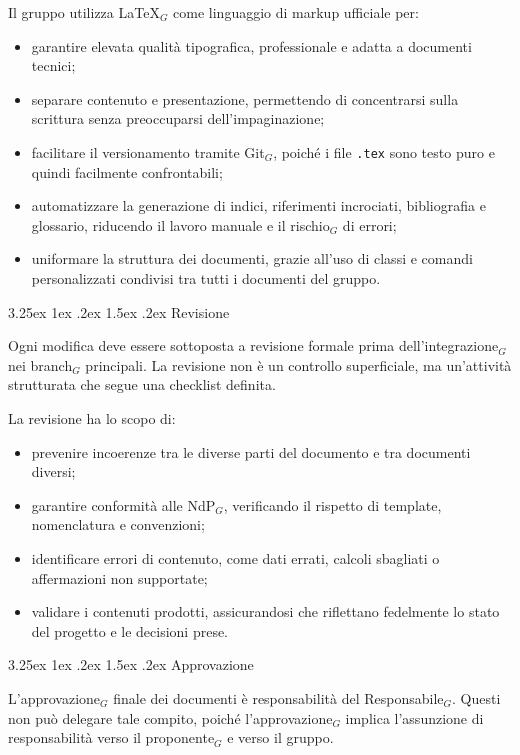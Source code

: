 \documentclass[a4paper, 10pt]{article}
\makeatletter
\renewcommand\paragraph{\@startsection{paragraph}{4}{\z@}%
  {3.25ex \@plus1ex \@minus .2ex}%
  {1.5ex \@plus .2ex}%
  {\normalfont\normalsize\bfseries}}
\makeatother
\begin{document}
Il gruppo utilizza \LaTeX$_G$ come linguaggio di markup ufficiale per:
\begin{itemize}
    \item garantire elevata qualità tipografica, professionale e adatta a documenti tecnici;
    \item separare contenuto e presentazione, permettendo di concentrarsi sulla scrittura senza preoccuparsi dell'impaginazione;
    \item facilitare il versionamento tramite Git$_G$, poiché i file \texttt{.tex} sono testo puro e quindi facilmente confrontabili;
    \item automatizzare la generazione di indici, riferimenti incrociati, bibliografia e glossario, riducendo il lavoro manuale e il rischio$_G$ di errori;
    \item uniformare la struttura dei documenti, grazie all'uso di classi e comandi personalizzati condivisi tra tutti i documenti del gruppo.
\end{itemize}

\paragraph{Revisione}

Ogni modifica deve essere sottoposta a revisione formale prima dell'integrazione$_G$ nei branch$_G$ principali. La revisione non è un controllo superficiale, ma un'attività strutturata che segue una checklist definita.

La revisione ha lo scopo di:
\begin{itemize}
    \item prevenire incoerenze tra le diverse parti del documento e tra documenti diversi;
    \item garantire conformità alle NdP$_G$, verificando il rispetto di template, nomenclatura e convenzioni;
    \item identificare errori di contenuto, come dati errati, calcoli sbagliati o affermazioni non supportate;
    \item validare i contenuti prodotti, assicurandosi che riflettano fedelmente lo stato del progetto e le decisioni prese.
\end{itemize}

\paragraph{Approvazione}

L'approvazione$_G$ finale dei documenti è responsabilità del Responsabile$_G$. Questi non può delegare tale compito, poiché l'approvazione$_G$ implica l'assunzione di responsabilità verso il proponente$_G$ e verso il gruppo.
\end{document}
